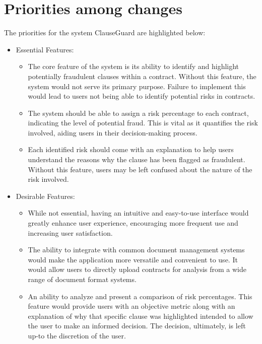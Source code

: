 \section{Priorities among changes \label{Section::Priorities among changes}}
The priorities for the system ClauseGuard are highlighted below: 
\begin{itemize}
    \item Essential Features: \begin{itemize}
        \item The core feature of the system is its ability to identify and highlight potentially fraudulent clauses within a contract. Without this feature, the system would not serve its primary purpose. Failure to implement this would lead to users not being able to identify potential risks in contracts.
        \item The system should be able to assign a risk percentage to each contract, indicating the level of potential fraud. This is vital as it quantifies the risk involved, aiding users in their decision-making process.


        \item Each identified risk should come with an explanation to help users understand the reasons why the clause has been flagged as fraudulent. Without this feature, users may be left confused about the nature of the risk involved.


       
        




    \end{itemize} 

    \item Desirable Features: 
    \begin{itemize}
        \item While not essential, having an intuitive and easy-to-use interface would greatly enhance user experience, encouraging more frequent use and increasing user satisfaction.

        \item The ability to integrate with common document management systems would make the application more versatile and convenient to use. It would allow users to directly upload contracts for analysis from a wide range of document format systems.

        \item  An ability to analyze and present a comparison of risk percentages. This feature would provide users with an objective metric along with an explanation of why that specific clause was highlighted intended to allow the user to make an informed decision. The decision, ultimately, is left up-to the discretion of the user. 


\end{itemize}
\end{itemize}
